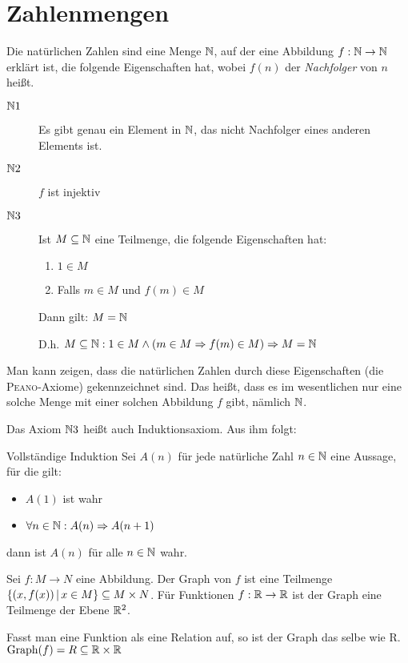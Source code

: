 \section{Zahlenmengen}
Die natürlichen Zahlen sind eine Menge $\mathbb{N}$, auf der eine Abbildung $f:\mathbb{N}\rightarrow\mathbb{N}$ erklärt ist, die folgende Eigenschaften hat, wobei $f(n)$ der \emph{Nachfolger} von $n$ heißt.
\begin{description}
  \item[$\mathbb{N} 1$] Es gibt genau ein Element in $\mathbb{N}$, das nicht Nachfolger eines anderen Elements ist.
  \item[$\mathbb{N} 2$] $f$ ist injektiv
  \item[$\mathbb{N} 3$] Ist $M\subseteq \mathbb{N}$ eine Teilmenge, die folgende Eigenschaften hat:
  \begin{enumerate}
    \item $1\in M$
    \item Falls $m\in M$ und $f(m)\in M$
  \end{enumerate}
  Dann gilt: $M = \mathbb{N}$

  D.h. $M\subseteq \mathbb{N} : 1\in M \wedge (m\in M \Rightarrow f(m)\in M) \Rightarrow M=\mathbb{N}$
\end{description}

Man kann zeigen, dass die natürlichen Zahlen durch diese Eigenschaften (die \textsc{Peano}-Axiome) gekennzeichnet sind. Das heißt, dass es im wesentlichen nur eine solche Menge mit einer solchen Abbildung $f$ gibt, nämlich $\mathbb{N}$.

Das Axiom $\mathbb{N} 3$ heißt auch Induktionsaxiom. Aus ihm folgt:

\begin{satz}{Vollständige Induktion}
  Sei $A(n)$ für jede natürliche Zahl $n \in\mathbb{N}$ eine Aussage, für die gilt:
  \begin{itemize}
    \item $A(1)$ ist wahr
    \item $\forall n\in\mathbb{N} : A(n) \Rightarrow A(n+1)$
  \end{itemize}
  dann ist $A(n)$ für alle $n\in\mathbb{N}$ wahr.
\end{satz}


Sei $f:M\rightarrow N$ eine Abbildung. Der Graph von $f$ ist eine Teilmenge $\left\{ (x,f(x)) \,\middle|\, x\in M \right\}\subseteq M\times N$.
Für Funktionen $f:\mathbb{R}\rightarrow\mathbb{R}$ ist der Graph eine Teilmenge der Ebene $\mathbb{R}^2$.

Fasst man eine Funktion als eine Relation auf, so ist der Graph das selbe wie R. $\mathrm{Graph}(f)=R\subseteq\mathbb{R}\times\mathbb{R}$

